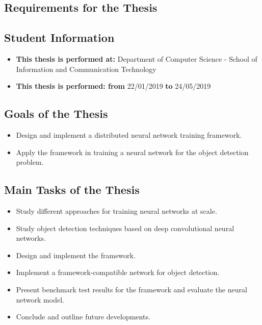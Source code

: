 \documentclass[a4paper, 12pt, oneside]{report}
\begin{document}
\fontsize {13pt}{16pt}
\selectfont

\setcounter{page}{1}
\begin{spacing}{1.0}
    \chapter*{Requirements for the Thesis}
    \section*{Student Information}
    \begin{itemize}
        \item \textbf{This thesis is performed at:} Department of Computer Science
        - School of Information and
        Communication Technology
        \item \textbf{This thesis is performed: from} 22/01/2019 \textbf{to}
        24/05/2019
    \end{itemize}
    \section*{Goals of the Thesis}
        \begin{itemize}
        \item Design and implement a distributed neural network training framework.
        \item Apply the framework in training a neural network for the object detection problem.
        \end{itemize}
    \section*{Main Tasks of the Thesis}
        \begin{itemize}
        \item Study different approaches for training neural networks at scale.
        \item Study object detection techniques based on deep convolutional neural networks.
        \item Design and implement the framework.
        \item Implement a framework-compatible network for object detection.
        \item Present benchmark test results for the framework and evaluate the neural network model.
        \item Conclude and outline future developments.
        \end{itemize}
    

\end{spacing}
\end{document}
